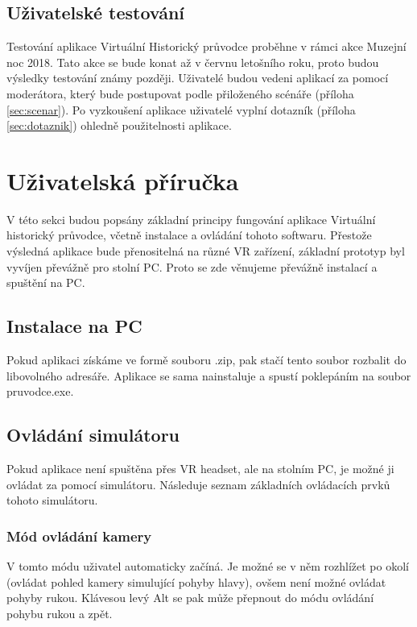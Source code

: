 \documentclass[thesis=B,czech]{FITthesis}[2012/06/26]
\begin{document}
	\subsection{Uživatelské testování}
	
	Testování aplikace Virtuální Historický průvodce proběhne v rámci akce Muzejní noc 2018. Tato akce se bude konat až v červnu letošního roku, proto budou výsledky testování známy později. Uživatelé budou vedeni aplikací za pomocí moderátora, který bude postupovat podle přiloženého scénáře (příloha \ref{sec:scenar}). Po vyzkoušení aplikace uživatelé vyplní dotazník (příloha \ref{sec:dotaznik}) ohledně použitelnosti aplikace.

	\section{Uživatelská příručka}
	
	V této sekci budou popsány základní principy fungování aplikace Virtuální historický průvodce, včetně instalace a ovládání tohoto softwaru. Přestože výsledná aplikace bude přenositelná na různé VR zařízení, základní prototyp byl vyvíjen převážně pro stolní PC. Proto se zde věnujeme převážně instalací a spuštění na PC.

\subsection{Instalace na PC}	
	Pokud aplikaci získáme ve formě souboru .zip, pak stačí tento soubor rozbalit do libovolného adresáře. Aplikace se sama nainstaluje a spustí poklepáním na soubor pruvodce.exe.
	
\subsection{Ovládání simulátoru}
Pokud aplikace není spuštěna přes VR headset, ale na stolním PC, je možné ji ovládat za pomocí simulátoru. Následuje seznam základních ovládacích prvků tohoto simulátoru.\cite{VRTK}

\subsubsection{Mód ovládání kamery}
V tomto módu uživatel automaticky začíná. Je možné se v něm rozhlížet po okolí (ovládat pohled kamery simulující pohyby hlavy), ovšem není možné ovládat pohyby rukou. Klávesou levý Alt se pak může přepnout do módu ovládání pohybu rukou a zpět.
\end{document}

